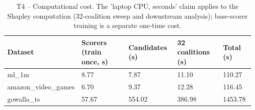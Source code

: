 \begin{table}[htbp]
\centering
\footnotesize
\caption{T4 -- Computational cost. The 'laptop CPU, seconds' claim applies to the Shapley computation (32-coalition sweep and downstream analysis); base-scorer training is a separate one-time cost.}
\label{tab:T4_cost}
\begin{tabular}{lllll}
\toprule
Dataset & Scorers (train once, s) & Candidates (s) & 32 coalitions (s) & Total (s) \\
\midrule
ml\_1m & 8.77 & 7.87 & 11.10 & 110.27 \\
amazon\_video\_games & 6.70 & 9.37 & 12.28 & 116.45 \\
gowalla\_ts & 57.67 & 554.02 & 386.98 & 1453.78 \\
\bottomrule
\end{tabular}
\end{table}
